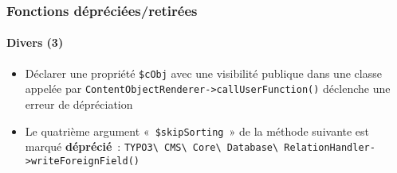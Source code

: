 %

\begin{frame}[fragile]
	\frametitle{Fonctions dépréciées/retirées}
	\framesubtitle{Divers (3)}


	\begin{itemize}
		\item Déclarer une propriété \texttt{\$cObj} avec une visibilité publique dans une
			classe appelée par \texttt{ContentObjectRenderer->callUserFunction()}
			déclenche une erreur de dépréciation
		\item Le quatrième argument «~\texttt{\$skipSorting}~» de la méthode suivante
			est marqué \textbf{déprécié}~:
			\small\texttt{TYPO3\textbackslash
				CMS\textbackslash
				Core\textbackslash
				Database\textbackslash
				RelationHandler->writeForeignField()}\normalsize
	\end{itemize}

\end{frame}

